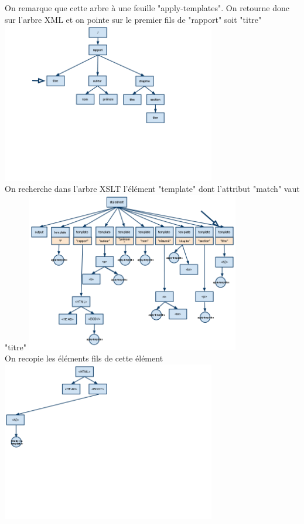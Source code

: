 \begin{center}
	        On remarque que cette arbre à une feuille "apply-templates". On retourne donc sur l'arbre XML et on 
pointe sur le premier fils de "rapport" soit "titre"
	        \includegraphics[width=0.7\textwidth]{img/XMLb.png}\\
	        
	        On recherche dans l'arbre XSLT l'élément "template" dont l'attribut "match" vaut "titre"
	        \includegraphics[width=0.7\textwidth]{img/XSLTb.png}\\
	        
	        On recopie les éléments fils de cette élément
	        \includegraphics[width=0.7\textwidth]{img/HTMLb.png}\\
	        

\end{center}
